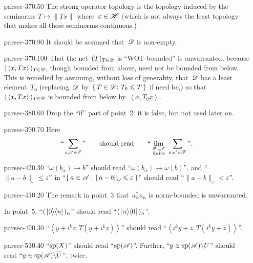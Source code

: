 \documentclass[b5page]{book}
\begin{document}
\begin{erratum}{parsec-370.50}
The strong operator topology is the topology
induced by the seminorms $T\mapsto \|Tx\|$ where~$x\in \mathscr{H}$
(which is not always the least topology that makes
all these seminorms continuous.)
\end{erratum}
\begin{erratum}{parsec-370.90}
It should be assumed that~$\mathscr{D}$ is non-empty.
\end{erratum}
\begin{erratum}{parsec-370.100}
That the net~$(T)_{T\in\mathscr{D}}$ is ``WOT-bounded''
is unwarranted,
because $(\,\left<x,Tx\right>\,)_{T\in\mathscr{D}}$,
though bounded from above,
need not be bounded from below.
This is remedied by assuming,
without loss of generality,
that~$\mathscr{D}$ has a least element~$T_0$
(replacing~$\mathscr{D}$ by~$\{\,T\in\mathscr{D}\colon T_0\leqslant T\,\}$
if need be,)
so that $(\,\left<x,Tx\right>\,)_{T\in\mathscr{D}}$
is bounded from below by~$\left<x,T_0x\right>$.
\end{erratum}
\begin{erratum}{parsec-380.60}
Drop the ``if'' part of point~2:
it is false, but not used later on.
\end{erratum}
\begin{erratum}{parsec-390.70}
Here
\begin{equation*}
\text{``}\sum_{e,e'\in\mathscr{E}}\text{''}
\qquad\text{should read}\qquad
\text{``}\lim_{\substack{\mathscr{F}\subseteq\mathscr{E}\\\text{finite}}}
\ \sum_{e,e'\in\mathscr{F}}\text{''}.
\end{equation*}
\end{erratum}
\begin{erratum}{parsec-420.30}
``$\omega(b_\alpha)\to b$'' should read ``$\omega(b_\alpha)\to \omega(b)$'',
and ``$\|a-b\|_\omega\leq\varepsilon$''
in ``$\{\,a\in\mathscr{A}\colon\,\|a-b\|_\omega\leqslant\varepsilon\,\}$''
should read ``$\|a-b\|_\omega<\varepsilon$''.
\end{erratum}
\begin{erratum}{parsec-430.20}
The remark in point~3 that~$a_\alpha^*a_\alpha$
is norm-bounded is unwarranted.

In point~5, ``$(\,\left|0\right>\!\left<n\right|\,)_n$''
should read ``$(\,\left|n\right>\!\left<0\right|\,)_n$''.
\end{erratum}
\begin{erratum}{parsec-490.30}
``$\left<y+i^kz,T(y+i^kz)\right>$''
should read
``$\left<i^ky+z,T(i^ky+z)\right>$''.
\end{erratum}
\begin{erratum}{parsec-530.40}
``$\mathrm{sp}(X)$'' should read ``$\mathrm{sp}(\mathscr{A})$''.
Further, ``$y\in \mathrm{sp}(\mathscr{A})\backslash U$''
should read ``$y\in \mathrm{sp}(\mathscr{A})\backslash\overline{U}$'', twice.
\end{erratum}
\end{document}
